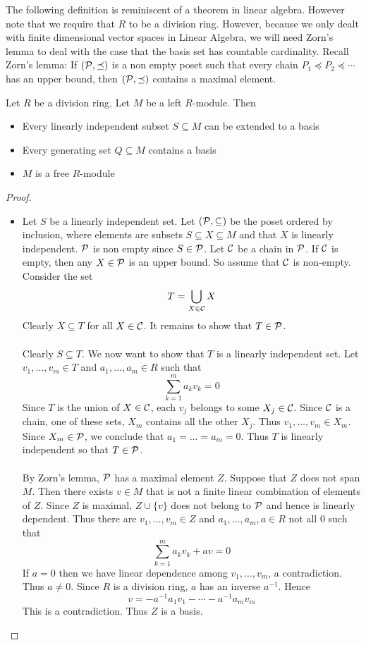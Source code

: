 \documentclass[a4paper]{article}
\begin{document}
The following definition is reminiscent of a theorem in linear algebra. However note that we require that $R$ to be a division ring. However, because we only dealt with finite dimensional vector spaces in Linear Algebra, we will need Zorn's lemma to deal with the case that the basis set has countable cardinality. Recall Zorn's lemma: If $(\mathcal{P},\preceq)$ is a non empty poset such that every chain $P_1\preceq P_2\preceq\cdots$ has an upper bound, then $(\mathcal{P},\preceq)$ contains a maximal element. 

\begin{thm}{}{} Let $R$ be a division ring. Let $M$ be a left $R$-module. Then
\begin{itemize}
\item Every linearly independent subset $S\subseteq M$ can be extended to a basis
\item Every generating set $Q\subseteq M$ contains a basis
\item $M$ is a free $R$-module
\end{itemize} \tcbline
\begin{proof}~\\
\begin{itemize}
\item Let $S$ be a linearly independent set. Let $(\mathcal{P},\subseteq)$ be the poset ordered by inclusion, where elements are subsets $S\subseteq X\subseteq M$ and that $X$ is linearly independent. $\mathcal{P}$ is non empty since $S\in\mathcal{P}$. Let $\mathcal{C}$ be a chain in $\mathcal{P}$. If $\mathcal{C}$ is empty, then any $X\in\mathcal{P}$ is an upper bound. So assume that $\mathcal{C}$ is non-empty. Consider the set $$T=\bigcup_{X\in\mathcal{C}}X$$ Clearly $X\subseteq T$ for all $X\in\mathcal{C}$. It remains to show that $T\in\mathcal{P}$. \\~\\

Clearly $S\subseteq T$. We now want to show that $T$ is a linearly independent set. Let $v_1,\dots,v_m\in T$ and $a_1,\dots,a_m\in R$ such that $$\sum_{k=1}^ma_kv_k=0$$ Since $T$ is the union of $X\in\mathcal{C}$, each $v_j$ belongs to some $X_j\in\mathcal{C}$. Since $\mathcal{C}$ is a chain, one of these sets, $X_m$ contains all the other $X_j$. Thus $v_1,\dots,v_m\in X_m$. Since $X_m\in\mathcal{P}$, we conclude that $a_1=\dots=a_m=0$. Thus $T$ is linearly independent so that $T\in\mathcal{P}$. \\~\\

By Zorn's lemma, $\mathcal{P}$ has a maximal element $Z$. Suppose that $Z$ does not span $M$. Then there exists $v\in M$ that is not a finite linear combination of elements of $Z$. Since $Z$ is maximal, $Z\cup\{v\}$ does not belong to $\mathcal{P}$ and hence is linearly dependent. Thus there are $v_1,\dots,v_m\in Z$ and $a_1,\dots,a_m,a\in R$ not all $0$ such that $$\sum_{k=1}^ma_kv_k+av=0$$ If $a=0$ then we have linear dependence among $v_1,\dots,v_m$, a contradiction. Thus $a\neq 0$. Since $R$ is a division ring, $a$ has an inverse $a^{-1}$. Hence $$v=-a^{-1}a_1v_1-\cdots-a^{-1}a_mv_m$$ This is a contradiction. Thus $Z$ is a basis. 


\end{itemize}
\end{proof}
\end{thm}
\end{document}
